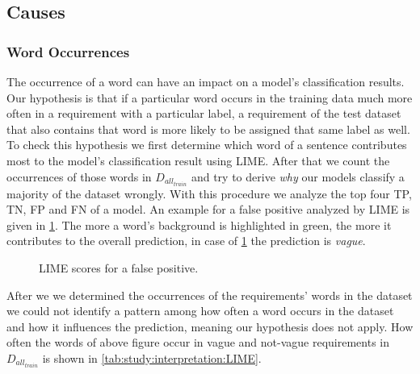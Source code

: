 \subsection{Causes}
\label{chp:study:sec:interpretation:subsec:causes}

\subsubsection{Word Occurrences}
\label{chp:study:sec:interpretation:subsec:causes:word_occurrences}
The occurrence of a word can have an impact on a model's classification results.
Our hypothesis is that if a particular word occurs in the training data much more often in a requirement with a particular label, a requirement of the test dataset that also contains that word is more likely to be assigned that same label as well.
To check this hypothesis we first determine which word of a sentence contributes most to the model's classification result using \ac{LIME}.
After that we count the occurrences of those words in $D_{all_{train}}$ and try to derive \textit{why} our models classify a majority of the dataset wrongly.
With this procedure we analyze the top four \ac{TP}, \ac{TN}, \ac{FP} and \ac{FN} of a model.
An example for a false positive analyzed by \ac{LIME} is given in \cref{fig:study:interpretation:LIME}.
The more a word's background is highlighted in green, the more it contributes to the overall prediction, in case of \cref{fig:study:interpretation:LIME} the prediction is \textit{vague}.
\begin{figure}[htpb]
    \centering
    \def\svgwidth{\columnwidth}
    
    \caption[Study Interpretation: Example for LIME]{LIME scores for a false positive.}\label{fig:study:interpretation:LIME}
\end{figure}

After we we determined the occurrences of the requirements' words in the dataset we could not identify a pattern among how often a word occurs in the dataset and how it influences the prediction, meaning our hypothesis does not apply.
How often the words of above figure occur in vague and not-vague requirements in $D_{all_{train}}$ is shown in \cref{tab:study:interpretation:LIME}.

